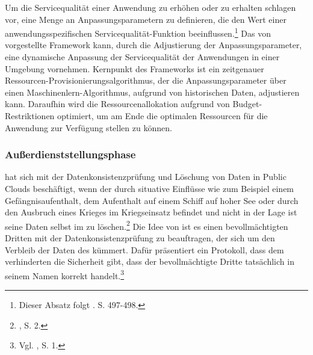 \newline
Um die Servicequalität einer \CC Anwendung zu erhöhen oder zu erhalten schlagen \cite{Zhu.2012} vor, eine Menge an Anpassungsparametern zu definieren, die den Wert einer anwendungsspezifischen Servicequalität-Funktion beeinflussen.\footnote{Dieser Absatz folgt \cite{Zhu.2012}. S. 497-498.}
Das von \cite{Zhu.2012} vorgestellte Framework kann, durch die Adjustierung der Anpassungsparameter, eine dynamische Anpassung der Servicequalität der Anwendungen in einer \CC Umgebung vornehmen. 
Kernpunkt des Frameworks ist ein zeitgenauer Ressourcen-Provisionierungsalgorithmus, der die Anpassungsparameter über einen Maschinenlern-Algorithmus, aufgrund von historischen Daten, adjustieren kann. 
Daraufhin wird die Ressourcenallokation aufgrund von Budget-Restriktionen optimiert, um am Ende die optimalen Ressourcen für die \CC Anwendung zur Verfügung stellen zu können.

%
%
\subsubsection{Außerdienststellungsphase}
\label{sec:LoesungenAusserdienststellungsphase}
\cite{Wang.2012b} hat sich mit der Datenkonsistenzprüfung und Löschung von Daten in Public Clouds beschäftigt, wenn der \CSU durch situative Einflüsse wie zum Beispiel einem Gefängnisaufenthalt, dem Aufenthalt auf einem Schiff auf hoher See oder durch den Ausbruch eines Krieges im Kriegseinsatz befindet und nicht in der Lage ist seine Daten selbst im \CS zu löschen.\footnote{\cite{Wang.2012b}, S. 2.}
Die Idee von \cite{Wang.2012b} ist es einen bevollmächtigten Dritten mit der Datenkonsistenzprüfung zu beauftragen, der sich um den Verbleib der Daten des \CSUs kümmert. Dafür präsentiert \cite{Wang.2012b} ein Protokoll, dass dem verhinderten \CSU die Sicherheit gibt, dass der bevollmächtigte Dritte tatsächlich in seinem Namen korrekt handelt.\footnote{Vgl. \cite{Wang.2012b}, S. 1.}

%
%
